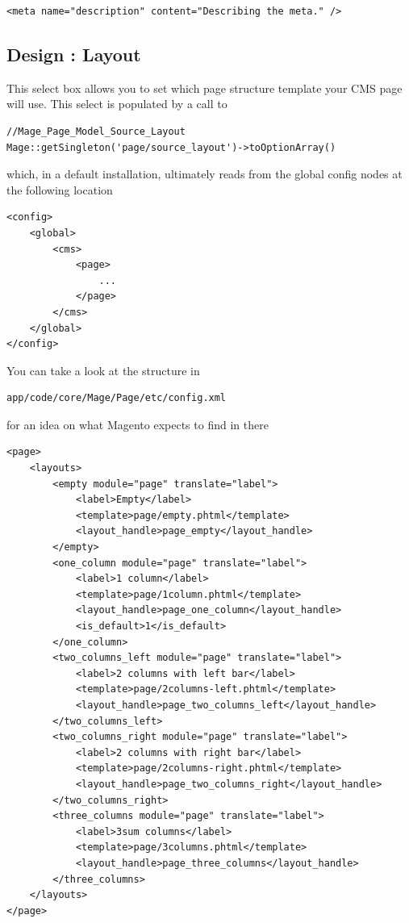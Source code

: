 \documentclass[oneside]{book}
\begin{document}
\begin{lstlisting}
<meta name="description" content="Describing the meta." />

\end{lstlisting}


\subsection{Design : Layout}

This select box allows you to set which page structure template your CMS page will use. This select is populated by a call to

\begin{lstlisting}
//Mage_Page_Model_Source_Layout
Mage::getSingleton('page/source_layout')->toOptionArray()

\end{lstlisting}


which, in a default installation, ultimately reads from the global config nodes at the following location

\begin{lstlisting}
<config>
    <global>
        <cms>
            <page>
                ...
            </page>
        </cms>
    </global>
</config>

\end{lstlisting}


You can take a look at the structure in

\begin{lstlisting}
app/code/core/Mage/Page/etc/config.xml

\end{lstlisting}


for an idea on what Magento expects to find in there

\begin{lstlisting}
<page>
    <layouts>
        <empty module="page" translate="label">
            <label>Empty</label>
            <template>page/empty.phtml</template>
            <layout_handle>page_empty</layout_handle>
        </empty>
        <one_column module="page" translate="label">
            <label>1 column</label>
            <template>page/1column.phtml</template>
            <layout_handle>page_one_column</layout_handle>
            <is_default>1</is_default>
        </one_column>
        <two_columns_left module="page" translate="label">
            <label>2 columns with left bar</label>
            <template>page/2columns-left.phtml</template>
            <layout_handle>page_two_columns_left</layout_handle>
        </two_columns_left>
        <two_columns_right module="page" translate="label">
            <label>2 columns with right bar</label>
            <template>page/2columns-right.phtml</template>
            <layout_handle>page_two_columns_right</layout_handle>
        </two_columns_right>
        <three_columns module="page" translate="label">
            <label>3sum columns</label>
            <template>page/3columns.phtml</template>
            <layout_handle>page_three_columns</layout_handle>
        </three_columns>
    </layouts>
</page>

\end{lstlisting}
\end{document}
